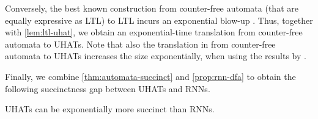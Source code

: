 Conversely, the best known construction from counter-free automata (that are equally expressive as LTL) to LTL
incurs an exponential blow-up \citep{MalerP90}.
Thus, together with \cref{lem:ltl-uhat}, we obtain an exponential-time translation from counter-free automata to UHATs.
Note that also the translation in \citep{YangCA24} from counter-free automata to UHATs increases the size exponentially,
when using the results by \cite{MalerP90}.

Finally, we combine \cref{thm:automata-succinct} and \cref{prop:rnn-dfa} 
to obtain the following succinctness gap between UHATs and RNNs.
\begin{corollary}
    UHATs can be exponentially more succinct than RNNs.
\end{corollary}
